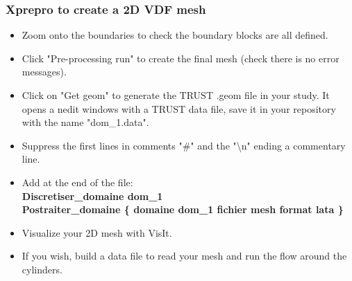\documentclass[10pt, hyperref={unicode=true,pdfusetitle, bookmarks=true,bookmarksnumbered=false,bookmarksopen=false, breaklinks=false,pdfborder={0 0 1},backref=true,colorlinks=true,linkcolor=darkblue,pageanchor}]{beamer}
\begin{document}
\begin{frame}
\frametitle{Xprepro to create a 2D VDF mesh}
\begin{block}{}

\begin{itemize}
\item Zoom onto the boundaries to check the boundary blocks are all defined.

\item Click "Pre-processing run" to create the final mesh (check there is no error messages).

\item Click on "Get geom" to generate the TRUST .geom file in your study. It opens a nedit windows with a TRUST data file, save it in your repository with the name "dom\_1.data".
\item Suppress the first lines in comments "\#" and the "\textbackslash{}n" ending a commentary line.
\item Add at the end of the file:\\
\textbf{Discretiser\_domaine dom\_1} \\
\textbf{Postraiter\_domaine \{ domaine dom\_1 fichier mesh format lata \} }
\item Visualize your 2D mesh with VisIt.
\item If you wish, build a data file to read your mesh and run the flow around the cylinders.
\end{itemize}

\end{block}
\end{frame}
\end{document}
